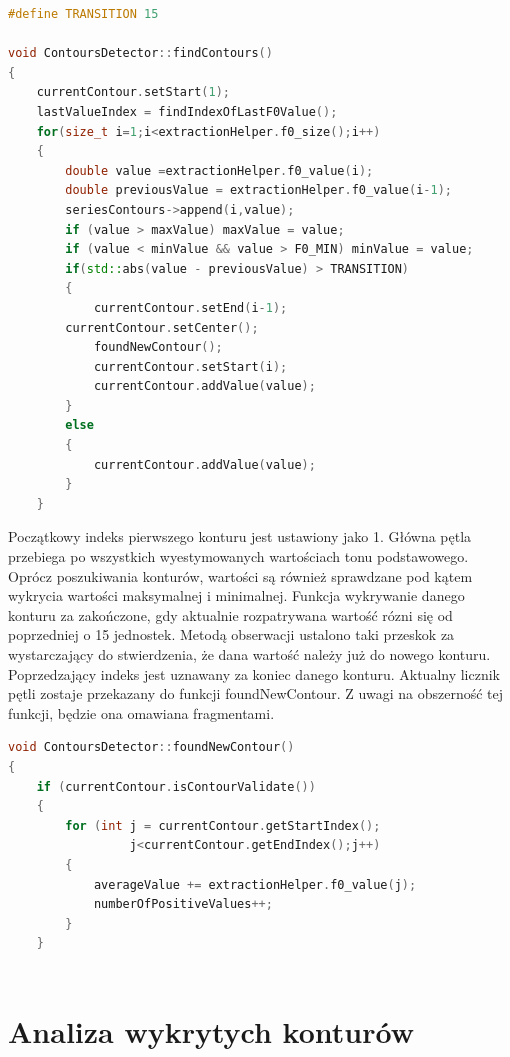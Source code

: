 \documentclass[a4paper,12 pt]{article}
\begin{document}
\begin{lstlisting}[caption={Początkowa faza funkcji wykrywającej kontury},label={lst:label},language=C++]
#define TRANSITION 15

void ContoursDetector::findContours()
{
    currentContour.setStart(1);
    lastValueIndex = findIndexOfLastF0Value();
    for(size_t i=1;i<extractionHelper.f0_size();i++)
    {
        double value =extractionHelper.f0_value(i);
        double previousValue = extractionHelper.f0_value(i-1); 
        seriesContours->append(i,value);
        if (value > maxValue) maxValue = value;
        if (value < minValue && value > F0_MIN) minValue = value;
        if(std::abs(value - previousValue) > TRANSITION)
        {
            currentContour.setEnd(i-1);
  	    currentContour.setCenter();    
            foundNewContour();
            currentContour.setStart(i);
            currentContour.addValue(value);
        }
        else
        {
            currentContour.addValue(value);
        }
    }
\end{lstlisting}
Początkowy indeks pierwszego konturu jest ustawiony jako 1. Główna pętla przebiega po wszystkich wyestymowanych wartościach tonu podstawowego. Oprócz poszukiwania konturów, wartości są również sprawdzane pod kątem wykrycia wartości maksymalnej i minimalnej. Funkcja wykrywanie danego konturu za zakończone, gdy aktualnie rozpatrywana wartość rózni się od poprzedniej o 15 jednostek. Metodą obserwacji ustalono taki przeskok za wystarczający do stwierdzenia, że dana wartość należy już do nowego konturu. Poprzedzający indeks jest uznawany za koniec danego konturu. Aktualny licznik pętli zostaje przekazany do funkcji foundNewContour. Z uwagi na obszerność tej funkcji, będzie ona omawiana fragmentami.
\begin{lstlisting}[caption={Funkcja zajmująca się analizą wstępną wykrytego konturu},label={lst:label},language=C++]
void ContoursDetector::foundNewContour()
{
    if (currentContour.isContourValidate())
    {
        for (int j = currentContour.getStartIndex();
        		 j<currentContour.getEndIndex();j++)
        {
            averageValue += extractionHelper.f0_value(j);
            numberOfPositiveValues++;
        }
    }
    
\end{lstlisting}
\section{Analiza wykrytych konturów}
\end{document}
